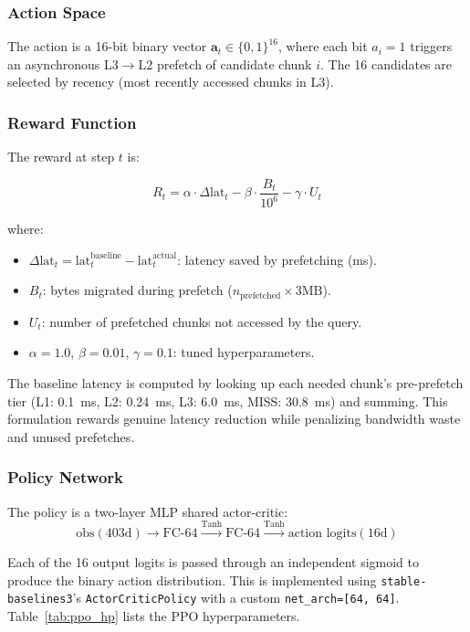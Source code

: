 \documentclass[conference]{IEEEtran}
\begin{document}
\subsubsection{Action Space}

The action is a 16-bit binary vector $\mathbf{a}_t \in \{0,1\}^{16}$, where each bit $a_i = 1$ triggers an asynchronous L3$\rightarrow$L2 prefetch of candidate chunk $i$. The 16 candidates are selected by recency (most recently accessed chunks in L3).

\subsubsection{Reward Function}

The reward at step $t$ is:

\begin{equation}
R_t = \alpha \cdot \Delta\text{lat}_t - \beta \cdot \frac{B_t}{10^6} - \gamma \cdot U_t
\label{eq:reward}
\end{equation}

where:
\begin{itemize}
    \item $\Delta\text{lat}_t = \text{lat}^{\text{baseline}}_t - \text{lat}^{\text{actual}}_t$: latency saved by prefetching (ms).
    \item $B_t$: bytes migrated during prefetch ($n_{\text{prefetched}} \times 3\text{MB}$).
    \item $U_t$: number of prefetched chunks not accessed by the query.
    \item $\alpha=1.0$, $\beta=0.01$, $\gamma=0.1$: tuned hyperparameters.
\end{itemize}

The baseline latency is computed by looking up each needed chunk's pre-prefetch tier (L1: 0.1~ms, L2: 0.24~ms, L3: 6.0~ms, MISS: 30.8~ms) and summing. This formulation rewards genuine latency reduction while penalizing bandwidth waste and unused prefetches.

\subsubsection{Policy Network}

The policy is a two-layer MLP shared actor-critic:
\[
\text{obs}(403\text{d}) \xrightarrow{} \text{FC-64} \xrightarrow{\text{Tanh}} \text{FC-64} \xrightarrow{\text{Tanh}} \text{action logits}(16\text{d})
\]

Each of the 16 output logits is passed through an independent sigmoid to produce the binary action distribution. This is implemented using \texttt{stable-baselines3}'s \texttt{ActorCriticPolicy} with a custom \texttt{net\_arch=[64,~64]}. Table~\ref{tab:ppo_hp} lists the PPO hyperparameters.
\end{document}
